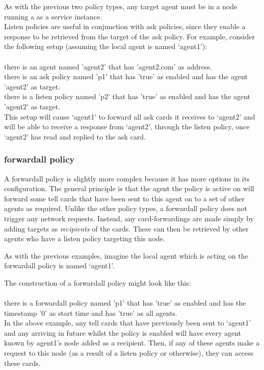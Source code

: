 \documentclass{scrartcl}
\newcommand{\ce}[1]{\textsf{#1}}
\begin{document}
As with the previous two policy types, any target agent must be in a node running a as a service instance.\\

Listen policies are useful in conjunction with ask policies, since they enable a response to be retrieved from the target of the ask policy. For example, consider the following setup (assuming the local agent is named `agent1'):\\
\\\ce{there is an agent named 'agent2' that has 'agent2.com' as address.\\
there is an ask policy named 'p1' that has 'true' as enabled and has the agent 'agent2' as target.\\
there is a listen policy named 'p2' that has 'true' as enabled and has the agent 'agent2' as target.}\\

This setup will cause `agent1' to forward all ask cards it receives to `agent2' and will be able to receive a response from `agent2', through the listen policy, once `agent2' has read and replied to the ask card.

\subsubsection{\ce{forwardall policy}}
A \ce{forwardall policy} is slightly more complex because it has more options in its configuration. The general principle is that the agent the policy is active on will forward some tell cards that have been sent to this agent on to a set of other agents as required. Unlike the other policy types, a \ce{forwardall policy} does not trigger any network requests. Instead, any card-forwardings are made simply by adding targets as \textit{recipients} of the cards. These can then be retrieved by other agents who have a \ce{listen policy} targeting this node.

As with the previous examples, imagine the local agent which is acting on the \ce{forwardall policy} is named `agent1'.

The construction of a \ce{forwardall policy} might look like this:\\
\\\ce{there is a forwardall policy named 'p1' that has 'true' as enabled and has the timestamp '0' as start time and has 'true' as all agents.}\\

In the above example, any tell cards that have previously been sent to `agent1' and any arriving in future whilst the policy is enabled will have every agent known by agent1's node added as a recipient. Then, if any of these agents make a request to this node (as a result of a \ce{listen policy} or otherwise), they can access these cards.
\end{document}
